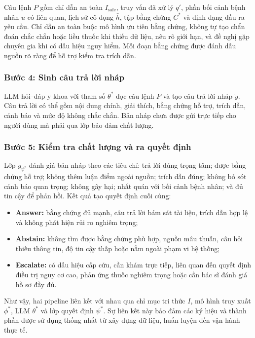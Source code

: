 Câu lệnh $P$ gồm chỉ dẫn an toàn $I_{\mathrm{safe}}$, truy vấn đã xử lý $q'$, phần bối cảnh bệnh nhân $u$ có liên quan, lịch sử cô đọng $\bar{h}$, tập bằng chứng $C^*$ và định dạng đầu ra yêu cầu. Chỉ dẫn an toàn buộc mô hình ưu tiên bằng chứng, không tự tạo chẩn đoán chắc chắn hoặc liều thuốc khi thiếu dữ liệu, nêu rõ giới hạn, và đề nghị gặp chuyên gia khi có dấu hiệu nguy hiểm. Mỗi đoạn bằng chứng được đánh dấu nguồn rõ ràng để hỗ trợ kiểm tra trích dẫn.

\subsubsection*{Bước 4: Sinh câu trả lời nháp}

LLM hỏi--đáp y khoa với tham số $\theta^*$ đọc câu lệnh $P$ và tạo câu trả lời nháp $\widetilde{y}$. Câu trả lời có thể gồm nội dung chính, giải thích, bằng chứng hỗ trợ, trích dẫn, cảnh báo và mức độ không chắc chắn. Bản nháp chưa được gửi trực tiếp cho người dùng mà phải qua lớp bảo đảm chất lượng.

\subsubsection*{Bước 5: Kiểm tra chất lượng và ra quyết định}

Lớp $g_{\psi^*}$ đánh giá bản nháp theo các tiêu chí: trả lời đúng trọng tâm; được bằng chứng hỗ trợ; không thêm luận điểm ngoài nguồn; trích dẫn đúng; không bỏ sót cảnh báo quan trọng; không gây hại; nhất quán với bối cảnh bệnh nhân; và đủ tin cậy để phản hồi. Kết quả tạo quyết định cuối cùng:
\begin{itemize}
    \item \textbf{Answer:} bằng chứng đủ mạnh, câu trả lời bám sát tài liệu, trích dẫn hợp lệ và không phát hiện rủi ro nghiêm trọng;
    \item \textbf{Abstain:} không tìm được bằng chứng phù hợp, nguồn mâu thuẫn, câu hỏi thiếu thông tin, độ tin cậy thấp hoặc nằm ngoài phạm vi hệ thống;
    \item \textbf{Escalate:} có dấu hiệu cấp cứu, cần khám trực tiếp, liên quan đến quyết định điều trị nguy cơ cao, phản ứng thuốc nghiêm trọng hoặc cần bác sĩ đánh giá hồ sơ đầy đủ.
\end{itemize}

Như vậy, hai pipeline liên kết với nhau qua chỉ mục tri thức $I$, mô hình truy xuất $\phi^*$, LLM $\theta^*$ và lớp quyết định $\psi^*$. Sự liên kết này bảo đảm các ký hiệu và thành phần được sử dụng thống nhất từ xây dựng dữ liệu, huấn luyện đến vận hành thực tế.
